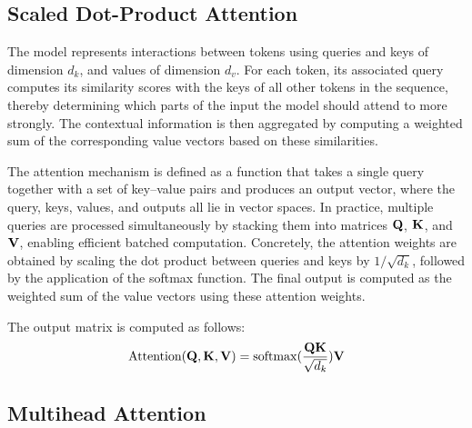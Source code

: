 \documentclass[letterpaper,twocolumn,10pt]{article}
\begin{document}
\subsection{Scaled Dot-Product Attention}
The model represents interactions between tokens using queries and keys of dimension $d_k$, and values of dimension $d_v$. For each token, its associated query computes its similarity scores with the keys of all other tokens in the sequence, thereby determining which parts of the input the model should attend to more strongly. The contextual information is then aggregated by computing a weighted sum of the corresponding value vectors based on these similarities.

The attention mechanism is defined as a function that takes a single query together with a set of key–value pairs and produces an output vector, where the query, keys, values, and outputs all lie in vector spaces. In practice, multiple queries are processed simultaneously by stacking them into matrices ${\mathbf{Q}}$, ${\mathbf{K}}$, and ${\mathbf{V}}$, enabling efficient batched computation. Concretely, the attention weights are obtained by scaling the dot product between queries and keys by $1/\sqrt{d_k}$, followed by the application of the softmax function. The final output is computed as the weighted sum of the value vectors using these attention weights.

The output matrix is computed as follows:
\[
    \text{Attention} ({\mathbf{Q}}, {\mathbf{K}}, {\mathbf{V}} ) = {\mathrm{softmax}}(\frac{{\mathbf{Q}}{\mathbf{K}}}{\sqrt{d_k}}){\mathbf{V}}
\]

\subsection{Multihead Attention}
\end{document}
